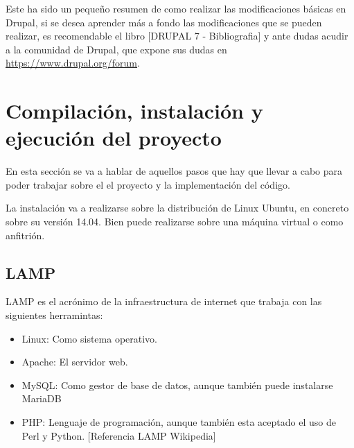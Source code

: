 Este ha sido un pequeño resumen de como realizar las modificaciones básicas en Drupal, si se desea aprender más a fondo las modificaciones que se pueden realizar, es recomendable el libro [DRUPAL 7 - Bibliografia] y ante dudas acudir a la comunidad de Drupal, que expone sus dudas en \url{https://www.drupal.org/forum}.

\section{Compilación, instalación y ejecución del proyecto}
En esta sección se va a hablar de aquellos pasos que hay que llevar a cabo para poder trabajar sobre el el proyecto y la implementación del código.

La instalación va a realizarse sobre la distribución de Linux Ubuntu, en concreto sobre su versión 14.04. Bien puede realizarse sobre una máquina virtual o como anfitrión.
\subsection{LAMP}
LAMP es el acrónimo de la infraestructura de internet que trabaja con las siguientes herramintas:
\begin{itemize}
\item Linux: Como sistema operativo.
\item Apache: El servidor web.
\item MySQL: Como gestor de base de datos, aunque también puede instalarse MariaDB
\item PHP: Lenguaje de programación,  aunque también esta aceptado el uso de Perl y Python.
[Referencia LAMP Wikipedia]
\end{itemize}

